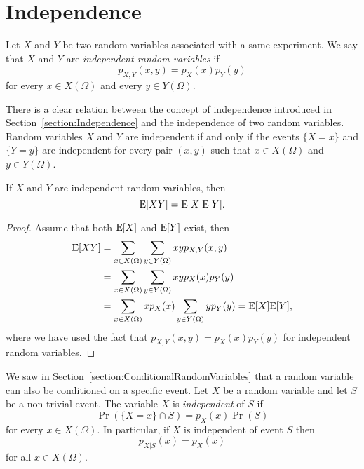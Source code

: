 \section{Independence}

Let $X$ and $Y$ be two random variables associated with a same experiment.
We say that $X$ and $Y$ are \emph{independent random variables} if 
\begin{equation*}
p_{X,Y} (x,y) = p_X (x) p_Y (y)
\end{equation*}
for every $x \in X(\Omega)$ and every $y \in Y(\Omega)$.

There is a clear relation between the concept of independence introduced in Section~\ref{section:Independence} and the independence of two random variables.
Random variables $X$ and $Y$ are independent if and only if the events $\{ X = x \}$ and $\{ Y = y \}$ are independent for every pair $(x, y)$ such that $x \in X(\Omega)$ and $y \in Y(\Omega)$.

\begin{proposition} \label{proposition:ExpectationProduct}
If $X$ and $Y$ are independent random variables, then
\begin{equation*}
\mathrm{E} [X Y] = \mathrm{E} [X] \mathrm{E} [Y] .
\end{equation*}
\end{proposition}
\begin{proof}
Assume that both $\mathrm{E} [X]$ and $\mathrm{E}[Y]$ exist, then
\begin{equation*}
\begin{split}
\mathrm{E} [XY]
&= \sum_{x \in X(\Omega)} \sum_{y \in Y(\Omega)} x y p_{X,Y} (x,y) \\
&= \sum_{x \in X(\Omega)} \sum_{y \in Y(\Omega)} x y p_X (x) p_Y (y) \\
&= \sum_{x \in X(\Omega)} x p_X (x) \sum_{y \in Y(\Omega)} y p_Y (y)
= \mathrm{E} [X] \mathrm{E} [Y] ,
\end{split}
\end{equation*}
where we have used the fact that $p_{X,Y} (x,y) = p_X (x) p_Y (y)$ for independent random variables.
\end{proof}

We saw in Section~\ref{section:ConditionalRandomVariables} that a random variable can also be conditioned on a specific event.
Let $X$ be a random variable and let $S$ be a non-trivial event.
The variable $X$ is \emph{independent} of $S$ if
\begin{equation*}
\Pr (\{X = x \} \cap S ) = p_X (x) \Pr (S)
\end{equation*}
for every $x \in X(\Omega)$.
In particular, if $X$ is independent of event $S$ then
\begin{equation*}
p_{X|S} (x) = p_X (x)
\end{equation*}
for all $x \in X(\Omega)$.

